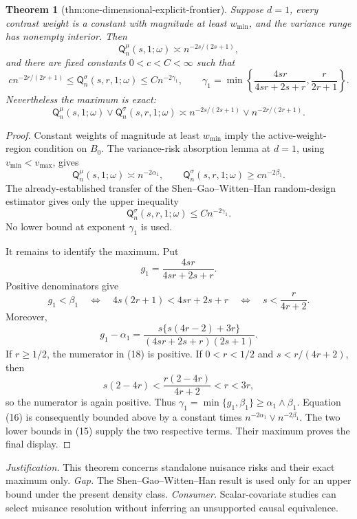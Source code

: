 \documentclass{article}
\newtheorem{theorem}{Theorem}
\begin{document}
\begin{theorem}[thm:one-dimensional-explicit-frontier]\label{thm:one-dimensional-explicit-frontier}
Suppose \(d=1\), every contrast weight is a constant with magnitude at least \(w_{\min}\), and the variance range has nonempty interior.  Then
\[
\mathsf Q_n^{\mu}(s,1;\omega)\asymp n^{-2s/(2s+1)},
\]
and there are fixed constants \(0<c<C<\infty\) such that
\[
c n^{-2r/(2r+1)}
\leq\mathsf Q_n^{\sigma}(s,r,1;\omega)
\leq C n^{-2\gamma_1},
\qquad
\gamma_1=\min\left\{\frac{4sr}{4sr+2s+r},\frac{r}{2r+1}\right\}.
\]
Nevertheless the maximum is exact:
\[
\mathsf Q_n^{\mu}(s,1;\omega)\vee\mathsf Q_n^{\sigma}(s,r,1;\omega)
\asymp n^{-2s/(2s+1)}\vee n^{-2r/(2r+1)}.
\]
\end{theorem}
\begin{proof}
Constant weights of magnitude at least \(w_{\min}\) imply the active-weight-region condition on \(B_0\).  The variance-risk absorption lemma at \(d=1\), using \(v_{\min}<v_{\max}\), gives
\[
\mathsf Q_n^{\mu}(s,1;\omega)\asymp n^{-2\alpha_1},
\qquad
\mathsf Q_n^{\sigma}(s,r,1;\omega)\geq c n^{-2\beta_1}.
\tag{15}
\]
The already-established transfer of the Shen--Gao--Witten--Han random-design estimator gives only the upper inequality
\[
\mathsf Q_n^{\sigma}(s,r,1;\omega)\leq Cn^{-2\gamma_1}.
\tag{16}
\]
No lower bound at exponent \(\gamma_1\) is used.

It remains to identify the maximum.  Put
\[
g_1=\frac{4sr}{4sr+2s+r}.
\]
Positive denominators give
\[
g_1<\beta_1
\quad\Longleftrightarrow\quad
4s(2r+1)<4sr+2s+r
\quad\Longleftrightarrow\quad
s<\frac{r}{4r+2}.
\tag{17}
\]
Moreover,
\[
g_1-\alpha_1
=\frac{s\{s(4r-2)+3r\}}
{(4sr+2s+r)(2s+1)}.
\tag{18}
\]
If \(r\geq1/2\), the numerator in (18) is positive.  If \(0<r<1/2\) and \(s<r/(4r+2)\), then
\[
s(2-4r)<\frac{r(2-4r)}{4r+2}<r<3r,
\]
so the numerator is again positive.  Thus \(\gamma_1=\min\{g_1,\beta_1\}\geq\alpha_1\wedge\beta_1\).  Equation (16) is consequently bounded above by a constant times \(n^{-2\alpha_1}\vee n^{-2\beta_1}\).  The two lower bounds in (15) supply the two respective terms.  Their maximum proves the final display.
\end{proof}
\par\smallskip\noindent \textit{Justification.} This theorem concerns standalone nuisance risks and their exact maximum only. \textit{Gap.} The Shen--Gao--Witten--Han result is used only for an upper bound under the present density class. \textit{Consumer.} Scalar-covariate studies can select nuisance resolution without inferring an unsupported causal equivalence.
\end{document}
